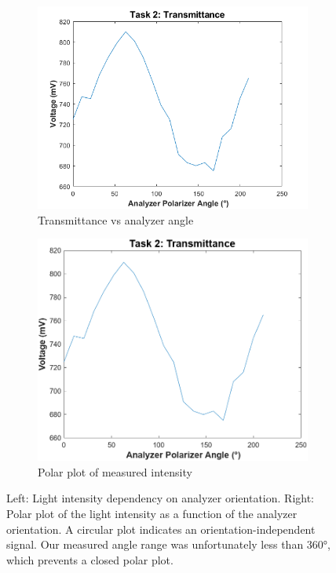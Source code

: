 \documentclass[12pt,a4paper]{article}
\begin{document}
\begin{figure}[H]
    \centering
    \begin{subfigure}[b]{0.48\linewidth}
        \centering
        \includegraphics[width=\linewidth]{figs/task2_transmittance.png}
        \caption{Transmittance vs analyzer angle}
        \label{fig:t2a}
    \end{subfigure}\hfill
    \begin{subfigure}[b]{0.48\linewidth}
        \centering
        \includegraphics[width=\linewidth]{figs/task2_polar.png}
        \caption{Polar plot of measured intensity}
        \label{fig:t2b}
    \end{subfigure}

    \caption{Left: Light intensity dependency on analyzer orientation. Right: Polar plot of the light intensity as a function of the analyzer orientation. A circular plot indicates an orientation-independent signal. Our measured angle range was unfortunately less than 360°, which prevents a closed polar plot.}
    \label{fig:t2}
\end{figure}
\end{document}
